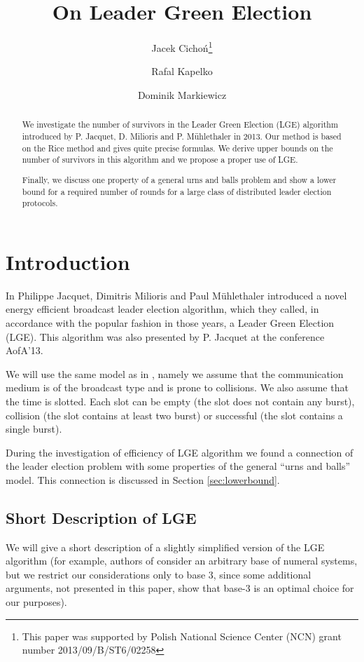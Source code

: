 \documentclass[proceedings]{dmtcs}
\title[On Leader Green Election]{On Leader Green Election}
\author[J. Cicho{\'n}, R. Kapelko and D. Markiewicz]{Jacek Cicho{\'n}\thanks{This paper was supported by Polish National Science Center (NCN) grant number 2013/09/B/ST6/02258}
\and Rafal Kapelko \and Dominik Markiewicz}
\begin{document}
\label{firstpage}
\maketitle
\begin{abstract}
We investigate the number of survivors in the Leader Green Election (LGE) algorithm introduced by
P. Jacquet, D. Milioris and P. M{\"u}hlethaler in 2013.
Our method is based on the Rice method and gives quite precise formulas. 
We derive upper bounds on the number of survivors in this algorithm and we propose a proper use of LGE.
\par 
Finally, we discuss one property of a general urns and balls problem and show a lower bound for a required number of rounds for a large class of distributed leader election protocols.
\par
\end{abstract}

\section{Introduction}


In \cite{DBLP:conf/mascots/JacquetMM13} Philippe Jacquet, Dimitris Milioris and Paul M{\"u}hlethaler introduced 
a novel energy efficient broadcast leader election algorithm, which they called,
in accordance with the popular fashion in those years, 
a Leader Green Election (LGE). 
This algorithm was also presented by P. Jacquet at the conference AofA'13.
\par
We will use the same model as in \cite{DBLP:conf/mascots/JacquetMM13}, namely we assume that
the communication medium is of the broadcast type and is
prone to collisions. We also assume that
the time is slotted. Each slot can be empty (the slot does not contain any burst),
collision (the slot contains at least two burst) or successful (the slot contains a single burst).
\par
During the investigation of efficiency of LGE algorithm we found a connection of the leader election problem with some  properties of the general "`urns and balls"' model. This connection is discussed in Section \ref{sec:lowerbound}.

\subsection{Short Description of LGE}

We will give a short description of a slightly simplified version of the LGE algorithm (for example,
authors of \cite{DBLP:conf/mascots/JacquetMM13} consider an arbitrary base of numeral systems, but we restrict our considerations only to base $3$, since some additional arguments, not presented in this paper, show that base-3 is an optimal choice for our purposes).\par
\end{document}
